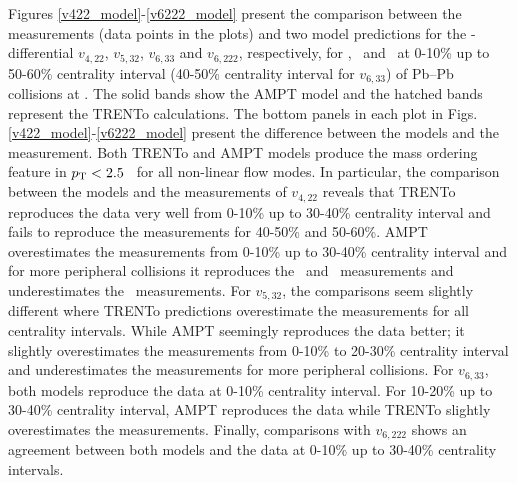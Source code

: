
Figures \ref{v422_model}-\ref{v6222_model} present the comparison between the measurements (data points in the plots) and two model predictions for the \pT-differential $v_{4,22}$, $v_{5,32}$, $v_{6,33}$ and $v_{6,222}$, respectively, for \pion, \kaon~and \proton~at 0-10\% up to 50-60\% centrality interval (40-50\% centrality interval for $v_{6,33}$) of Pb--Pb collisions at \sNN. The solid bands show the AMPT model and the hatched bands represent the TRENTo calculations. The bottom panels in each plot in Figs. \ref{v422_model}-\ref{v6222_model} present the difference between the models and the measurement. Both TRENTo and AMPT models produce the mass ordering feature in $p_{\rm{T}}<2.5$ \GeV~for all non-linear flow modes. In particular, the comparison between the models and the measurements of $v_{4,22}$  reveals that TRENTo reproduces the data very well from 0-10\% up to 30-40\% centrality interval and fails to reproduce the measurements for 40-50\% and 50-60\%. AMPT overestimates the measurements from 0-10\% up to 30-40\% centrality interval and for more peripheral collisions it reproduces the \kaon~and \proton~measurements and underestimates the \pion~measurements. For $v_{5,32}$, the comparisons seem slightly different where TRENTo predictions overestimate the measurements for all centrality intervals. While AMPT seemingly reproduces the data better; it slightly overestimates the measurements from 0-10\% to 20-30\% centrality interval and underestimates the measurements for more peripheral collisions. For $v_{6,33}$, both models reproduce the data at 0-10\% centrality interval. For 10-20\% up to 30-40\% centrality interval, AMPT reproduces the data while TRENTo slightly overestimates the measurements. Finally, comparisons with $v_{6,222}$ shows an agreement between both models and the data at 0-10\% up to 30-40\% centrality intervals. 

